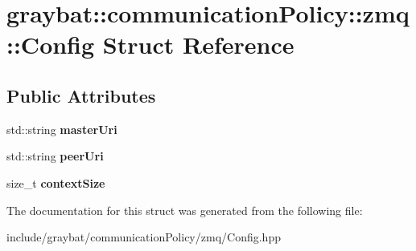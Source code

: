 \hypertarget{structgraybat_1_1communicationPolicy_1_1zmq_1_1Config}{}\section{graybat\+:\+:communication\+Policy\+:\+:zmq\+:\+:Config Struct Reference}
\label{structgraybat_1_1communicationPolicy_1_1zmq_1_1Config}
\subsection*{Public Attributes}
\begin{DoxyCompactItemize}
\item 
\hypertarget{structgraybat_1_1communicationPolicy_1_1zmq_1_1Config_a19c7f3fa2f01d3868e84acfa8a0d1dfa}{}std\+::string {\bfseries master\+Uri}\label{structgraybat_1_1communicationPolicy_1_1zmq_1_1Config_a19c7f3fa2f01d3868e84acfa8a0d1dfa}

\item 
\hypertarget{structgraybat_1_1communicationPolicy_1_1zmq_1_1Config_a0bbee29d33bcc2a09f6fade448c38efb}{}std\+::string {\bfseries peer\+Uri}\label{structgraybat_1_1communicationPolicy_1_1zmq_1_1Config_a0bbee29d33bcc2a09f6fade448c38efb}

\item 
\hypertarget{structgraybat_1_1communicationPolicy_1_1zmq_1_1Config_a36e9e40d7f01d9a8125effa0c98919fb}{}size\+\_\+t {\bfseries context\+Size}\label{structgraybat_1_1communicationPolicy_1_1zmq_1_1Config_a36e9e40d7f01d9a8125effa0c98919fb}

\end{DoxyCompactItemize}


The documentation for this struct was generated from the following file\+:\begin{DoxyCompactItemize}
\item 
include/graybat/communication\+Policy/zmq/Config.\+hpp\end{DoxyCompactItemize}
